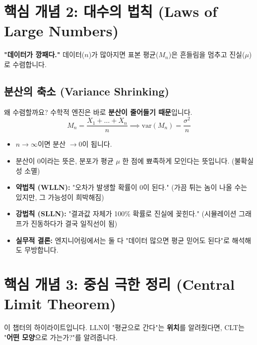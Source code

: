 \documentclass[11pt,a4paper]{book}
\theoremstyle{definition}
\begin{document}
\section{핵심 개념 2: 대수의 법칙 (Laws of Large Numbers)}

\textbf{"데이터가 깡패다."} 데이터($n$)가 많아지면 표본 평균($M_n$)은 흔들림을 멈추고 진실($\mu$)로 수렴합니다.

\subsection{분산의 축소 (Variance Shrinking)}
왜 수렴할까요? 수학적 엔진은 바로 \textbf{분산이 줄어들기 때문}입니다.
\[ M_n = \frac{X_1 + \dots + X_n}{n} \implies \text{var}(M_n) = \frac{\sigma^2}{n} \]

\begin{itemize}
    \item $n \to \infty$이면 분산 $\to 0$이 됩니다.
    \item 분산이 0이라는 뜻은, 분포가 평균 $\mu$ 한 점에 뾰족하게 모인다는 뜻입니다. (불확실성 소멸)
\end{itemize}

\begin{warningbox}[title={약법칙(Weak) vs 강법칙(Strong)}]
\begin{itemize}
    \item \textbf{약법칙 (WLLN):} "오차가 발생할 확률이 0이 된다." (가끔 튀는 놈이 나올 수는 있지만, 그 가능성이 희박해짐)
    \item \textbf{강법칙 (SLLN):} "결과값 자체가 100\% 확률로 진실에 꽂힌다." (시뮬레이션 그래프가 진동하다가 결국 일직선이 됨)
    \item \textbf{실무적 결론:} 엔지니어링에서는 둘 다 "데이터 많으면 평균 믿어도 된다"로 해석해도 무방합니다.
\end{itemize}
\end{warningbox}

\section{핵심 개념 3: 중심 극한 정리 (Central Limit Theorem)}

이 챕터의 하이라이트입니다. LLN이 "평균으로 간다"는 \textbf{위치}를 알려줬다면, CLT는 "\textbf{어떤 모양}으로 가는가?"를 알려줍니다.
\end{document}
